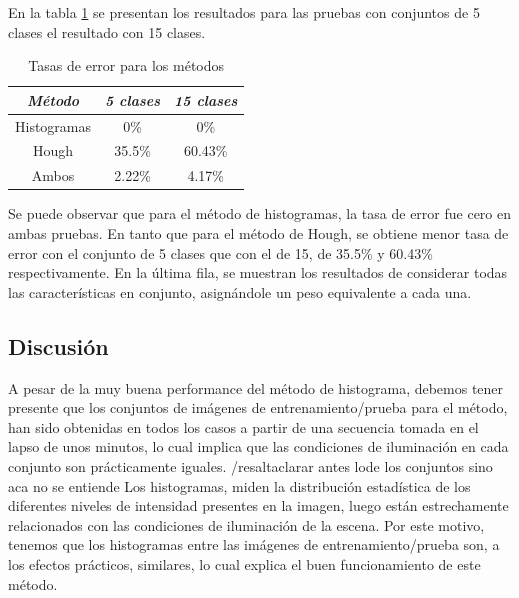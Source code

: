 \documentclass[conference,a4paper,10pt,oneside,final]{tfmpd}
\begin{document}
%

En la tabla \ref{tablaerrores} se presentan los resultados para las pruebas
con conjuntos de 5 clases%
el resultado con
15 clases. 
%
%
\begin{table}
\caption{Tasas de error para los métodos}
\begin{center}\begin{tabular}{ccc}
\hline \emph{Método} & \emph{5 clases} & \emph{15 clases}\\ 
\hline Histogramas & 0\% & 0\%\\ 
\hline Hough & 35.5\% & 60.43\%\\ 
\hline Ambos & 2.22\% & 4.17\%\\ 
\hline 
\end{tabular}\end{center}
\label{tablaerrores}
\end{table}
%
Se puede observar que para el método de histogramas, la tasa de error fue cero
en ambas pruebas. En tanto que para el método de Hough, se obtiene menor tasa de
error con el conjunto de 5 clases que con el de 15, de 35.5\% y 60.43\%
respectivamente. En la última fila, se muestran los resultados de considerar todas
las características en conjunto, asignándole un peso equivalente a cada una. 

%
%
\subsection{Discusión}
A pesar de la muy buena performance del método de histograma, debemos tener
presente que los conjuntos de imágenes de entrenamiento/prueba para el método, 
han sido obtenidas en todos los casos a partir de una secuencia tomada en el 
lapso de unos minutos, lo cual implica que las condiciones de iluminación en
cada conjunto son prácticamente iguales. /resalt{aclarar antes lode los conjuntos sino aca no se entiende}
Los histogramas, miden la distribución estadística de los diferentes niveles
de intensidad presentes en la imagen, luego están estrechamente relacionados
con las condiciones de iluminación de la escena. Por este motivo, tenemos
que los histogramas entre las imágenes de entrenamiento/prueba son, a los
efectos prácticos, similares, lo cual explica el buen funcionamiento de este
método.
\end{document}
